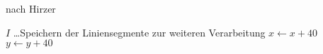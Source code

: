 \begin{algorithm}[!ht]
\caption{ nach Hirzer}
\label{alg:linedetection-hirzer}
	\begin{algorithmic}[1]
		\Require $I$
				\State {}
				\State {}
				\State \ldots \Comment Speichern der Liniensegmente zur weiteren Verarbeitung
				\State {}
				\State {}
				\State $ x \gets x + 40$
			\EndFor
			\State $y \gets y + 40$
		\EndFor
	\end{algorithmic}
\end{algorithm}
